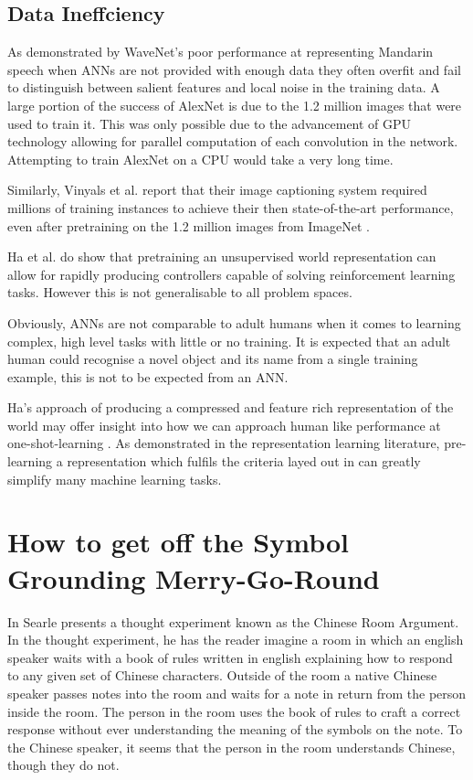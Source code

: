 \subsection{Data Ineffciency}
As demonstrated by WaveNet's poor performance at representing Mandarin speech \cite{wavenet} when \acp{ANN} are not provided with enough data they often overfit and fail to distinguish between salient features and local noise in the training data. A large portion of the success of AlexNet \cite{krizhevsky2012imagenet} is due to the 1.2 million images that were used to train it. This was only possible due to the advancement of \ac{GPU} technology allowing for parallel computation of each convolution in the network. Attempting to train AlexNet on a \ac{CPU} would take a very long time.

Similarly, Vinyals et al. \cite{vinyals2015show} report that their image captioning system required millions of training instances to achieve their then state-of-the-art performance, even after pretraining on the 1.2 million images from ImageNet \cite{ImNet}.

Ha et al. \cite{ha2018world, ha2018recurrent} do show that pretraining an unsupervised world representation can allow for rapidly producing controllers capable of solving reinforcement learning tasks. However this is not generalisable to all problem spaces.

Obviously, \acp{ANN} are not comparable to adult humans when it comes to learning complex, high level tasks with little or no training. It is expected that an adult human could recognise a novel object and its name from a single training example, this is not to be expected from an \ac{ANN}.

Ha's approach of producing a compressed and feature rich representation of the world \cite{ha2018world, ha2018recurrent} may offer insight into how we can approach human like performance at one-shot-learning \cite{vinyals2016matching}. As demonstrated in the representation learning literature, pre-learning a representation which fulfils the criteria layed out in \cite{repRev} can greatly simplify many machine learning tasks.


\section{How to get off the Symbol Grounding Merry-Go-Round} 
In \cite{searle1980minds} Searle presents a thought experiment known as the Chinese Room Argument. In the thought experiment, he has the reader imagine a room in which an english speaker waits with a book of rules written in english explaining how to respond to any given set of Chinese characters. Outside of the room a native Chinese speaker passes notes into the room and waits for a note in return from the person inside the room. The person in the room uses the book of rules to craft a correct response without ever understanding the meaning of the symbols on the note. To the Chinese speaker, it seems that the person in the room understands Chinese, though they do not.

